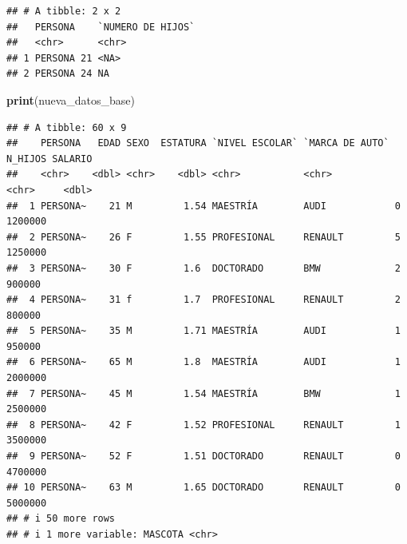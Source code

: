 \documentclass[
]{article}
\newenvironment{Shaded}{\begin{snugshade}}{\end{snugshade}}
\newcommand{\AttributeTok}[1]{\textcolor[rgb]{0.13,0.29,0.53}{#1}}
\newcommand{\CommentTok}[1]{\textcolor[rgb]{0.56,0.35,0.01}{\textit{#1}}}
\newcommand{\FunctionTok}[1]{\textcolor[rgb]{0.13,0.29,0.53}{\textbf{#1}}}
\newcommand{\NormalTok}[1]{#1}
\newcommand{\SpecialCharTok}[1]{\textcolor[rgb]{0.81,0.36,0.00}{\textbf{#1}}}
\newcommand{\StringTok}[1]{\textcolor[rgb]{0.31,0.60,0.02}{#1}}
\begin{document}
\begin{Shaded}
\end{Shaded}

\begin{verbatim}
## # A tibble: 2 x 2
##   PERSONA    `NUMERO DE HIJOS`
##   <chr>      <chr>            
## 1 PERSONA 21 <NA>             
## 2 PERSONA 24 NA
\end{verbatim}

\begin{Shaded}
\begin{Highlighting}[]
\FunctionTok{print}\NormalTok{(nueva\_datos\_base)}
\end{Highlighting}
\end{Shaded}

\begin{verbatim}
## # A tibble: 60 x 9
##    PERSONA   EDAD SEXO  ESTATURA `NIVEL ESCOLAR` `MARCA DE AUTO` N_HIJOS SALARIO
##    <chr>    <dbl> <chr>    <dbl> <chr>           <chr>           <chr>     <dbl>
##  1 PERSONA~    21 M         1.54 MAESTRÍA        AUDI            0       1200000
##  2 PERSONA~    26 F         1.55 PROFESIONAL     RENAULT         5       1250000
##  3 PERSONA~    30 F         1.6  DOCTORADO       BMW             2        900000
##  4 PERSONA~    31 f         1.7  PROFESIONAL     RENAULT         2        800000
##  5 PERSONA~    35 M         1.71 MAESTRÍA        AUDI            1        950000
##  6 PERSONA~    65 M         1.8  MAESTRÍA        AUDI            1       2000000
##  7 PERSONA~    45 M         1.54 MAESTRÍA        BMW             1       2500000
##  8 PERSONA~    42 F         1.52 PROFESIONAL     RENAULT         1       3500000
##  9 PERSONA~    52 F         1.51 DOCTORADO       RENAULT         0       4700000
## 10 PERSONA~    63 M         1.65 DOCTORADO       RENAULT         0       5000000
## # i 50 more rows
## # i 1 more variable: MASCOTA <chr>
\end{verbatim}
\end{document}
